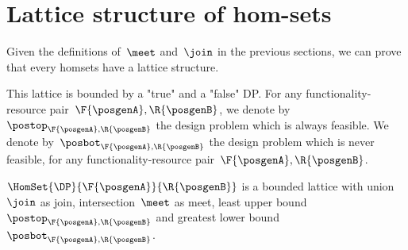 \section{Lattice structure of \DP hom-sets}

Given the definitions of~$\meet$ and~$\join$ in the previous sections, we can prove that every \DP homsets have a lattice structure.

This lattice is bounded by a "true" and a "false" DP.
For any functionality-resource pair~$\F{\posgenA},\R{\posgenB}$, we denote by~$\postop_{\F{\posgenA},\R{\posgenB}}$ the design problem which is always feasible.
We denote by~$\posbot_{\F{\posgenA},\R{\posgenB}}$ the design problem which is never feasible, for any functionality-resource pair~$\F{\posgenA},\R{\posgenB}$.

\begin{lemma}
    \label{lem:dpboundedlattice}
    $\HomSet{\DP}{\F{\posgenA}}{\R{\posgenB}}$ is a bounded lattice with union~$\join$ as join, intersection~$\meet$ as meet, least upper bound~$\postop_{\F{\posgenA},\R{\posgenB}}$ and greatest lower bound~$\posbot_{\F{\posgenA},\R{\posgenB}}$.
\end{lemma}


